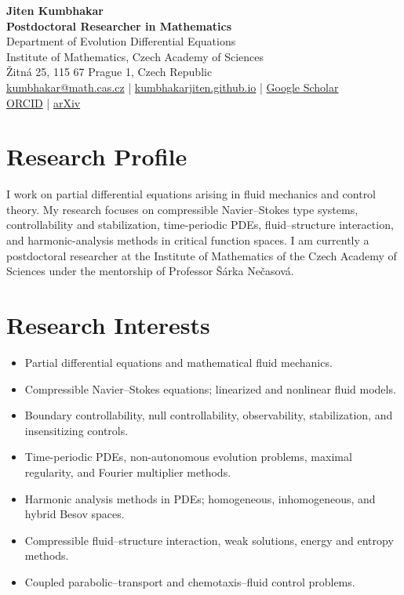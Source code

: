 \documentclass[10pt,a4paper]{article}
\begin{document}
\begin{center}
    {\LARGE\bfseries Jiten Kumbhakar} \\[4pt]
    \textbf{Postdoctoral Researcher in Mathematics} \\[2pt]
    Department of Evolution Differential Equations \\[1pt]
    Institute of Mathematics, Czech Academy of Sciences \\[1pt]
    \v{Z}itn\'a 25, 115 67 Prague 1, Czech Republic \\[5pt]
    \; \href{mailto:kumbhakar@math.cas.cz}{kumbhakar@math.cas.cz}
    \quad | \quad
    \; \href{https://kumbhakarjiten.github.io/}{kumbhakarjiten.github.io}
    \quad | \quad
    \; \href{https://scholar.google.com/citations?user=325vEj0AAAAJ\&hl=en}{Google Scholar}
    \\[2pt]
    \; \href{https://orcid.org/0000-0001-8126-8911}{ORCID}
    \quad | \quad
    \; \href{https://arxiv.org/search/?query=Jiten+Kumbhakar\&searchtype=author}{arXiv}
\end{center}

\section*{Research Profile}
I work on partial differential equations arising in fluid mechanics and control theory. My research focuses on compressible Navier--Stokes type systems, controllability and stabilization, time-periodic PDEs, fluid--structure interaction, and harmonic-analysis methods in critical function spaces. I am currently a postdoctoral researcher at the Institute of Mathematics of the Czech Academy of Sciences under the mentorship of Professor \v{S}\'arka Ne\v{c}asov\'a.

\section*{Research Interests}
\begin{itemize}
    \item Partial differential equations and mathematical fluid mechanics.
    \item Compressible Navier--Stokes equations; linearized and nonlinear fluid models.
    \item Boundary controllability, null controllability, observability, stabilization, and insensitizing controls.
    \item Time-periodic PDEs, non-autonomous evolution problems, maximal regularity, and Fourier multiplier methods.
    \item Harmonic analysis methods in PDEs; homogeneous, inhomogeneous, and hybrid Besov spaces.
    \item Compressible fluid--structure interaction, weak solutions, energy and entropy methods.
    \item Coupled parabolic--transport and chemotaxis--fluid control problems.
\end{itemize}
\end{document}
